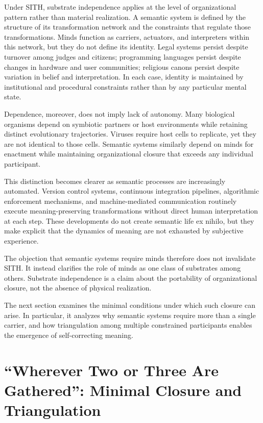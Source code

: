 \documentclass[11pt,oneside]{article}
\begin{document}
Under SITH, substrate independence applies at the level of organizational pattern rather than material realization. A semantic system is defined by the structure of its transformation network and the constraints that regulate those transformations. Minds function as carriers, actuators, and interpreters within this network, but they do not define its identity. Legal systems persist despite turnover among judges and citizens; programming languages persist despite changes in hardware and user communities; religious canons persist despite variation in belief and interpretation. In each case, identity is maintained by institutional and procedural constraints rather than by any particular mental state.

Dependence, moreover, does not imply lack of autonomy. Many biological organisms depend on symbiotic partners or host environments while retaining distinct evolutionary trajectories. Viruses require host cells to replicate, yet they are not identical to those cells. Semantic systems similarly depend on minds for enactment while maintaining organizational closure that exceeds any individual participant.

This distinction becomes clearer as semantic processes are increasingly automated. Version control systems, continuous integration pipelines, algorithmic enforcement mechanisms, and machine-mediated communication routinely execute meaning-preserving transformations without direct human interpretation at each step. These developments do not create semantic life ex nihilo, but they make explicit that the dynamics of meaning are not exhausted by subjective experience.

The objection that semantic systems require minds therefore does not invalidate SITH. It instead clarifies the role of minds as one class of substrates among others. Substrate independence is a claim about the portability of organizational closure, not the absence of physical realization.

The next section examines the minimal conditions under which such closure can arise. In particular, it analyzes why semantic systems require more than a single carrier, and how triangulation among multiple constrained participants enables the emergence of self-correcting meaning.

\section{``Wherever Two or Three Are Gathered'': Minimal Closure and Triangulation}
\end{document}
